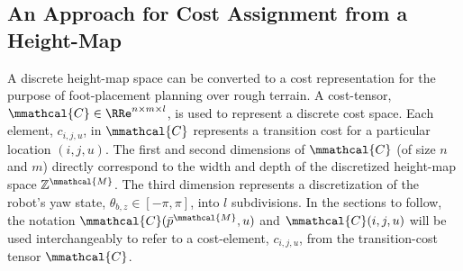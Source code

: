 		\subsection{An Approach for Cost Assignment from a Height-Map}

			A discrete height-map space can be converted to a cost representation for the purpose of foot-placement planning over rough terrain. A cost-tensor, $\mmathcal{C}\in\RRe^{n\times m\times l}$, is used to represent a discrete cost space. Each element, $c_{i,j,u}$, in $\mmathcal{C}$ represents a transition cost for a particular location $(i,j,u)$. The first and second dimensions of $\mmathcal{C}$ (of size $n$ and $m$) directly correspond to the width and depth of the discretized height-map space $\mathbb{Z}^{\mmathcal{M}}$. The third dimension represents a discretization of the robot's yaw state, $\theta_{b,z}\in[-\pi,\pi]$, into $l$ subdivisions.  In the sections to follow, the notation $\mmathcal{C}(\bar{p}^{\mmathcal{M}},u)$ and $\mmathcal{C}(i,j,u)$ will be used interchangeably to refer to a cost-element, $c_{i,j,u}$, from the transition-cost tensor $\mmathcal{C}$.


